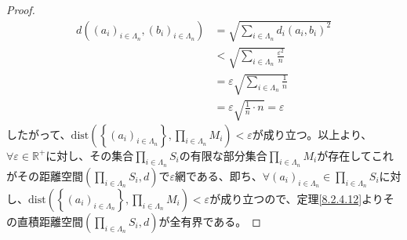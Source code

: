 \documentclass[dvipdfmx]{jsarticle}
\begin{document}
\begin{proof}
\begin{align*}
d\left( \left( a_{i} \right)_{i \in \varLambda_{n}},\left( b_{i} \right)_{i \in \varLambda_{n}} \right) &= \sqrt{\sum_{i \in \varLambda_{n}} {d_{i}\left( a_{i},b_{i} \right)}^{2}}\\
&< \sqrt{\sum_{i \in \varLambda_{n}} \frac{\varepsilon^{2}}{n}}\\
&= \varepsilon\sqrt{\sum_{i \in \varLambda_{n}} \frac{1}{n}}\\
&= \varepsilon\sqrt{\frac{1}{n} \cdot n} = \varepsilon
\end{align*}
したがって、$\mathrm{dist}\left( \left\{ \left( a_{i} \right)_{i \in \varLambda_{n}} \right\},\prod_{i \in \varLambda_{n}} M_{i} \right) < \varepsilon$が成り立つ。以上より、$\forall\varepsilon \in \mathbb{R}^{+}$に対し、その集合$\prod_{i \in \varLambda_{n}} S_{i}$の有限な部分集合$\prod_{i \in \varLambda_{n}} M_{i}$が存在してこれがその距離空間$\left( \prod_{i \in \varLambda_{n}} S_{i},d \right)$で$\varepsilon$網である、即ち、$\forall\left( a_{i} \right)_{i \in \varLambda_{n}} \in \prod_{i \in \varLambda_{n}} S_{i}$に対し、$\mathrm{dist}\left( \left\{ \left( a_{i} \right)_{i \in \varLambda_{n}} \right\},\prod_{i \in \varLambda_{n}} M_{i} \right) < \varepsilon$が成り立つので、定理\ref{8.2.4.12}よりその直積距離空間$\left( \prod_{i \in \varLambda_{n}} S_{i},d \right)$が全有界である。
\end{proof}
\end{document}
